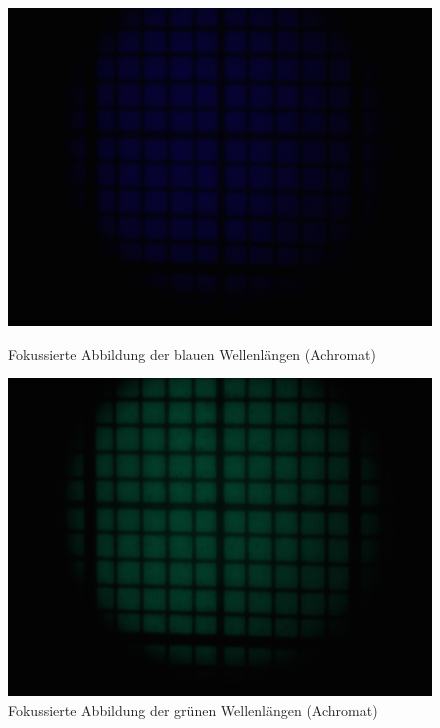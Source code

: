 \begin{figure}[h!]
	\begin{minipage}[t]{0.32\textwidth}
		\includegraphics[clip=true, trim=700px 950px 900px 250px, width=\linewidth]{img/ChromAbb/Prakt_Linsenfehler_2015_06_04_071}
		\caption{Fokussierte Abbildung der blauen Wellenlängen (Achromat)}
		\label{fig:cm_blau_achromat}
	\end{minipage}
	\hfill
	\begin{minipage}[t]{0.32\textwidth}
		\includegraphics[clip=true, trim=700px 950px 900px 250px, width=\linewidth]{img/ChromAbb/Prakt_Linsenfehler_2015_06_04_072}
		\caption{Fokussierte Abbildung der grünen Wellenlängen (Achromat)}
		\label{fig:cm_gruen_achromat}
	\end{minipage}
	\hfill
	\begin{minipage}[t]{0.32\textwidth}

\end{minipage}
\end{figure}
